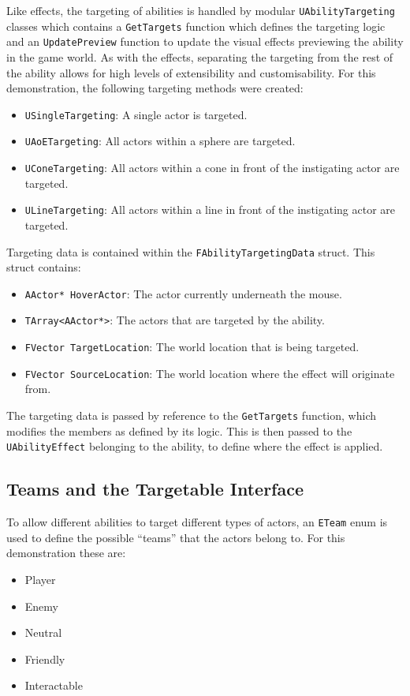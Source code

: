 \documentclass{article}
\begin{document}
Like effects, the targeting of abilities is handled by modular \texttt{UAbilityTargeting} classes which contains a \texttt{GetTargets} function which defines the targeting logic and an \texttt{UpdatePreview} function to update the visual effects previewing the ability in the game world. As with the effects, separating the targeting from the rest of the ability allows for high levels of extensibility and customisability. For this demonstration, the following targeting methods were created:
\begin{itemize}
    \item \texttt{USingleTargeting}: A single actor is targeted.
    \item \texttt{UAoETargeting}: All actors within a sphere are targeted.
    \item \texttt{UConeTargeting}: All actors within a cone in front of the instigating actor are targeted.
    \item \texttt{ULineTargeting}: All actors within a line in front of the instigating actor are targeted.
\end{itemize}

Targeting data is contained within the \texttt{FAbilityTargetingData} struct. This struct contains:
\begin{itemize}
    \item \texttt{AActor* HoverActor}: The actor currently underneath the mouse.
    \item \texttt{TArray<AActor*>}: The actors that are targeted by the ability.
    \item \texttt{FVector TargetLocation}: The world location that is being targeted.
    \item \texttt{FVector SourceLocation}: The world location where the effect will originate from.
\end{itemize}

The targeting data is passed by reference to the \texttt{GetTargets} function, which modifies the members as defined by its logic. This is then passed to the \texttt{UAbilityEffect} belonging to the ability, to define where the effect is applied.

\subsection{Teams and the Targetable Interface}

To allow different abilities to target different types of actors, an \texttt{ETeam} enum is used to define the possible “teams” that the actors belong to. For this demonstration these are:
\begin{itemize}
    \item Player
    \item Enemy
    \item Neutral
    \item Friendly
    \item Interactable
\end{itemize}
\end{document}
